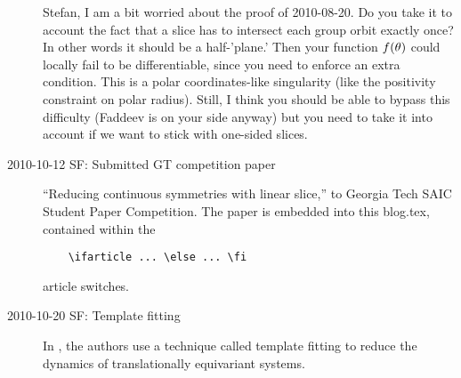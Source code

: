 \begin{description}
Stefan, I am a bit worried about the proof of 2010-08-20. Do you take it to account
the fact that a slice has to intersect each group orbit exactly once? In other words it should be a
half-'plane.' Then your function $f({\bf \theta})$ could locally fail to be differentiable, since you
need to enforce an extra condition. This is a polar coordinates-like singularity (like the
positivity constraint on polar radius). Still, I think you should be able to bypass this difficulty (Faddeev is
on your side anyway) but you need to take it into account if we want to stick with one-sided slices.

\item[2010-10-12 SF: Submitted GT competition paper]
``Reducing continuous symmetries with linear slice,''
to Georgia Tech SAIC Student Paper Competition.
The paper is embedded into this blog.tex,
contained within the
\begin{verbatim}
	\ifarticle ... \else ... \fi
\end{verbatim}
article switches.


\item[2010-10-20 SF: Template fitting] In
    , the authors use a technique
    called template fitting to reduce the dynamics of translationally
    equivariant systems.


\end{description}
